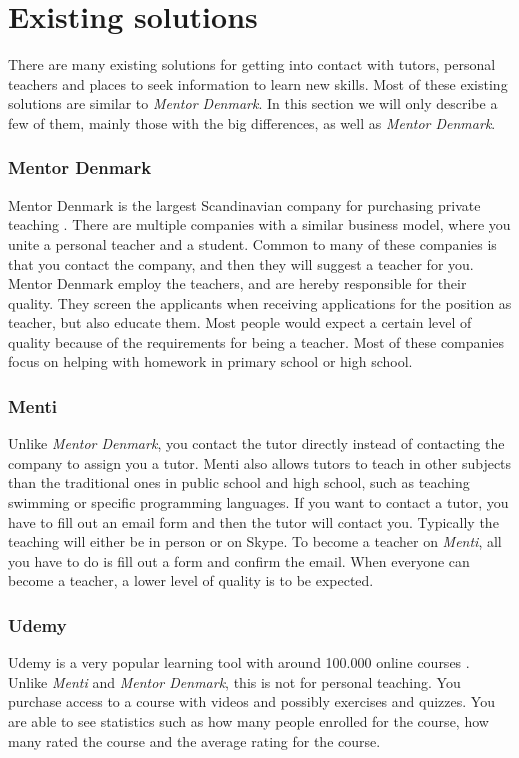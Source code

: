 \section{Existing solutions}
There are many existing solutions for getting into contact with tutors, personal teachers and places to seek information to learn new skills.
Most of these existing solutions are similar to \textit{Mentor Denmark}.  
In this section we will only describe a few of them, mainly those with the big differences, as well as \textit{Mentor Denmark}.

\subsubsection{Mentor Denmark}
Mentor Denmark is the largest Scandinavian company for purchasing private teaching \cite{skandinaviens-stoeste-lektiefirma}.
There are multiple companies with a similar business model, where you unite a personal teacher and a student. 
Common to many of these companies is that you contact the company, and then they will suggest a teacher for you.
Mentor Denmark employ the teachers, and are hereby responsible for their quality. 
They screen the applicants when receiving applications for the position as teacher, but also educate them. 
Most people would expect a certain level of quality because of the requirements for being a teacher.
Most of these companies focus on helping with homework in primary school or high school.

\subsubsection{Menti}
Unlike \textit{Mentor Denmark}, you contact the tutor directly instead of contacting the company to assign you a tutor.
Menti also allows tutors to teach in other subjects than the traditional ones in public school and high school, such as teaching swimming or specific programming languages.
If you want to contact a tutor, you have to fill out an email form and then the tutor will contact you.
Typically the teaching will either be in person or on Skype.
To become a teacher on \textit{Menti}, all you have to do is fill out a form and confirm the email.
When everyone can become a teacher, a lower level of quality is to be expected.

\subsubsection{Udemy}
Udemy is a very popular learning tool with around 100.000 online courses \cite{udemy}.
Unlike \textit{Menti} and \textit{Mentor Denmark}, this is not for personal teaching. 
You purchase access to a course with videos and possibly exercises and quizzes. 
You are able to see statistics such as how many people enrolled for the course, how many rated the course and the average rating for the course.

